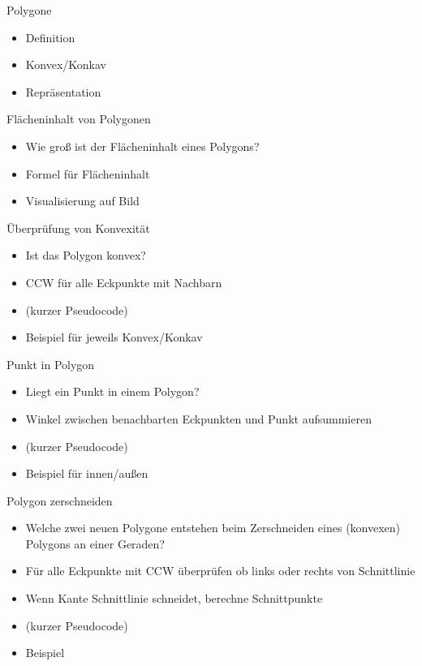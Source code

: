 \begin{frame}{Polygone}
	\begin{itemize}
		\item Definition
		\item Konvex/Konkav
		\item Repräsentation
	\end{itemize}
\end{frame}

\begin{frame}{Flächeninhalt von Polygonen}
	\begin{itemize}
		\item Wie groß ist der Flächeninhalt eines Polygons?
		\item Formel für Flächeninhalt
		\item Visualisierung auf Bild
	\end{itemize}
\end{frame}

\begin{frame}{Überprüfung von Konvexität}
	\begin{itemize}
		\item Ist das Polygon konvex?
		\item CCW für alle Eckpunkte mit Nachbarn
		\item (kurzer Pseudocode)
		\item Beispiel für jeweils Konvex/Konkav
	\end{itemize}
\end{frame}

\begin{frame}{Punkt in Polygon}
	\begin{itemize}
		\item Liegt ein Punkt in einem Polygon?
		\item Winkel zwischen benachbarten Eckpunkten und Punkt aufsummieren
		\item (kurzer Pseudocode)
		\item Beispiel für innen/außen
	\end{itemize}
\end{frame}

\begin{frame}{Polygon zerschneiden}
	\begin{itemize}
		\item Welche zwei neuen Polygone entstehen beim Zerschneiden eines (konvexen) Polygons an einer Geraden?
		\item Für alle Eckpunkte mit CCW überprüfen ob links oder rechts von Schnittlinie
		\item Wenn Kante Schnittlinie schneidet, berechne Schnittpunkte
		\item (kurzer Pseudocode)
		\item Beispiel
	\end{itemize}
\end{frame}
